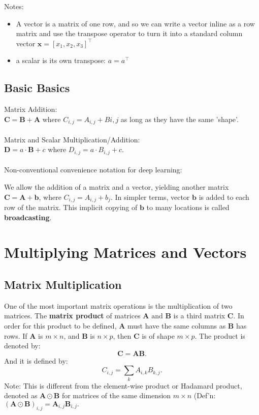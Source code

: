 \documentclass[11pt,twocolumn]{report}
\begin{document}
Notes: 
\begin{itemize}
	\item A vector is a matrix of one row, and so we can write a vector inline as
		a row matrix and use the transpose operator to turn it into a standard
		column vector $\bm{x} = [x_1, x_2, x_3]^\intercal$
	\item a scalar is its own transpose: $a = a^\intercal$
\end{itemize}

\subsection{Basic Basics}
Matrix Addition:\\
$\bm{C} = \bm{B} + \bm{A}$ where $C_{i, j} = A_{i, j} + B{i, j}$ as long as
they have the same 'shape'.\\\\
Matrix and Scalar Multiplication/Addition:\\
$\bm{D} = a \cdot \bm{B} + c$ where $D_{i, j} = a \cdot B_{i, j} + c$.\\\\
Non-conventional convenience notation for deep learning:
\begin{flushleft}
	We allow the addition of a matrix and a vector, yielding another matrix 
	$\bm{C} = \bm{A} + \bm{b}$, where $C_{i, j} = A_{i, j} + b_j$. In simpler
	terms, vector $\bm{b}$ is added to each row of the matrix. This implicit
	copying of $\bm{b}$ to many locations is called \textbf{broadcasting}.
\end{flushleft}

\section{Multiplying Matrices and Vectors}
\subsection{Matrix Multiplication}
One of the most important matrix operations is the multiplication of two matrices. The
\textbf{matrix product} of matrices $\bm{A} \text{ and } \bm{B}$ is a third
matrix $\bm{C}$. In order for this product to be defined, $\bm{A}$ must have
the same columns as $\bm{B}$ has rows. If $\bm{A}$ is $m \times n$, and
$\bm{B}$ is $n \times p$, then $\bm{C}$ is of shape $m \times p$.
The product is denoted by:
\begin{equation}
	\bm{C} = \bm{A}\bm{B}.
\end{equation}
And it is defined by:
\begin{equation}
	C_{i, j} = \sum_k A_{i, k}B_{k, j}.
\end{equation}
Note: This is different from the element-wise product or Hadamard product,
denoted as $\bm{A} \odot \bm{B}$ for matrices of the same dimension $m \times
n$ (Def'n: $(\bm{A} \odot \bm{B})_{i, j} = \bm{A}_{i, j}\bm{B}_{i, j}.$
\end{document}
